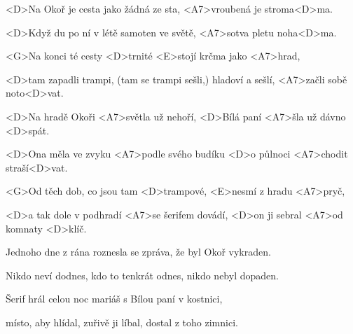 

\zs
<D>Na Okoř je cesta jako žádná ze sta, <A7>vroubená je stroma<D>ma.

<D>Když du po ní v létě samoten ve světě, <A7>sotva pletu noha<D>ma.

<G>Na konci té cesty <D>trnité <E>stojí krčma jako <A7>hrad,

<D>tam zapadli trampi, (tam se trampi sešli,) hladoví a sešlí, <A7>začli sobě noto<D>vat.
\ks

\zr
<D>Na hradě Okoři <A7>světla už nehoří, <D>Bílá paní <A7>šla už dávno <D>spát.

<D>Ona měla ve zvyku <A7>podle svého budíku <D>o půlnoci <A7>chodit straší<D>vat.

<G>Od těch dob, co jsou tam <D>trampové, <E>nesmí z hradu <A7>pryč,

<D>a tak dole v podhradí <A7>se šerifem dovádí, <D>on ji sebral <A7>od komnaty <D>klíč.
\kr

\zs
Jednoho dne z rána roznesla se zpráva, že byl Okoř vykraden.

Nikdo neví dodnes, kdo to tenkrát odnes, nikdo nebyl dopaden.

Šerif hrál celou noc mariáš s Bílou paní v kostnici,

místo, aby hlídal, zuřivě ji líbal, dostal z toho zimnici.
\ks

\zr \kr

\kp
